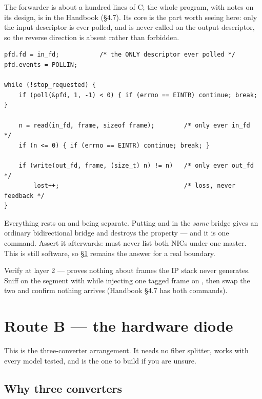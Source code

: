\documentclass[11pt,a4paper]{article}
\begin{document}
The forwarder is about a hundred lines of C; the whole program, with notes on
its design, is in the Handbook (\S4.7). Its core is the part worth seeing
here: only the input descriptor is ever polled, and  is never
called on the output descriptor, so the reverse direction is absent rather
than forbidden.

\begin{lstlisting}[style=c,caption={The loop, in essence}]
pfd.fd = in_fd;           /* the ONLY descriptor ever polled */
pfd.events = POLLIN;

while (!stop_requested) {
    if (poll(&pfd, 1, -1) < 0) { if (errno == EINTR) continue; break; }

    n = read(in_fd, frame, sizeof frame);        /* only ever in_fd  */
    if (n <= 0) { if (errno == EINTR) continue; break; }

    if (write(out_fd, frame, (size_t) n) != n)   /* only ever out_fd */
        lost++;                                  /* loss, never feedback */
}
\end{lstlisting}

\begin{warnbox}
Everything rests on  and  being separate. Putting
 and  in the \emph{same} bridge gives an ordinary
bidirectional bridge and destroys the property --- and it is one command.
Assert it afterwards:  must never list both NICs under
one master. This is still software, so \S\ref{sec:hard} remains the answer for
a real boundary.
\end{warnbox}

Verify at layer 2 ---  proves nothing about frames the IP stack
never generates. Sniff  on the \dstside{} segment
with  while injecting one tagged frame on \srcside{}, then swap
the two and confirm nothing arrives (Handbook \S4.7 has both commands).

\section{Route B --- the hardware diode}
\label{sec:hard}

This is the three-converter arrangement. It needs no fiber splitter, works
with every model tested, and is the one to build if you are unsure.

\subsection{Why three converters}
\end{document}
